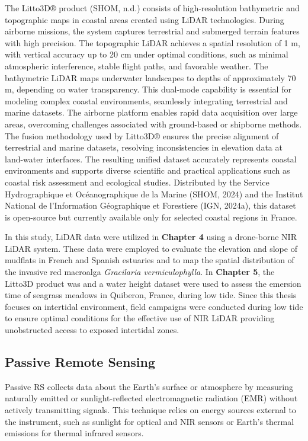 \documentclass[
  letterpaper,
  11pt,
  english,
  singlespacing,
  headsepline]{MastersDoctoralThesis}
\begin{document}
\begin{spacing}{1.5}
The Litto3D® product (SHOM, n.d.) consists of high-resolution
bathymetric and topographic maps in coastal areas created using LiDAR
technologies. During airborne missions, the system captures terrestrial
and submerged terrain features with high precision. The topographic
LiDAR achieves a spatial resolution of 1 m, with vertical accuracy up to
20 cm under optimal conditions, such as minimal atmospheric
interference, stable flight paths, and favorable weather. The
bathymetric LiDAR maps underwater landscapes to depths of approximately
70 m, depending on water transparency. This dual-mode capability is
essential for modeling complex coastal environments, seamlessly
integrating terrestrial and marine datasets. The airborne platform
enables rapid data acquisition over large areas, overcoming challenges
associated with ground-based or shipborne methods. The fusion
methodology used by Litto3D® ensures the precise alignment of
terrestrial and marine datasets, resolving inconsistencies in elevation
data at land-water interfaces. The resulting unified dataset accurately
represents coastal environments and supports diverse scientific and
practical applications such as coastal risk assessment and ecological
studies. Distributed by the Service Hydrographique et Océanographique de
la Marine (SHOM, 2024) and the Institut National de l'Information
Géographique et Forestiere (IGN, 2024a), this dataset is open-source but
currently available only for selected coastal regions in France.

In this study, LiDAR data were utilized in \textbf{Chapter 4} using a
drone-borne NIR LiDAR system. These data were employed to evaluate the
elevation and slope of mudflats in French and Spanish estuaries and to
map the spatial distribution of the invasive red macroalga
\emph{Gracilaria vermiculophylla}. In \textbf{Chapter 5}, the Litto3D
product was and a water height dataset were used to assess the emersion
time of seagrass meadows in Quiberon, France, during low tide. Since
this thesis focuses on intertidal environment, field campaigns were
conducted during low tide to ensure optimal conditions for the effective
use of NIR LiDAR providing unobstructed access to exposed intertidal
zones.

\subsection{Passive Remote Sensing}\label{passive-remote-sensing}

Passive RS collects data about the Earth's surface or atmosphere by
measuring naturally emitted or sunlight-reflected electromagnetic
radiation (EMR) without actively transmitting signals. This technique
relies on energy sources external to the instrument, such as sunlight
for optical and NIR sensors or Earth's thermal emissions for thermal
infrared sensors.


\end{spacing}
\end{document}

